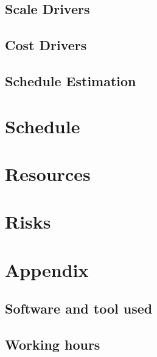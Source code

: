 \documentclass[]{report}
\begin{document}
	\section{Scale Drivers}
	
	
	\section{Cost Drivers}
	
	
	\section{Schedule Estimation}
	

\chapter{Schedule}

\chapter{Resources}

\chapter{Risks}

\appendix

\chapter{Appendix}

	\section{Software and tool used}
	

	\section{Working hours}
	
\end{document}
